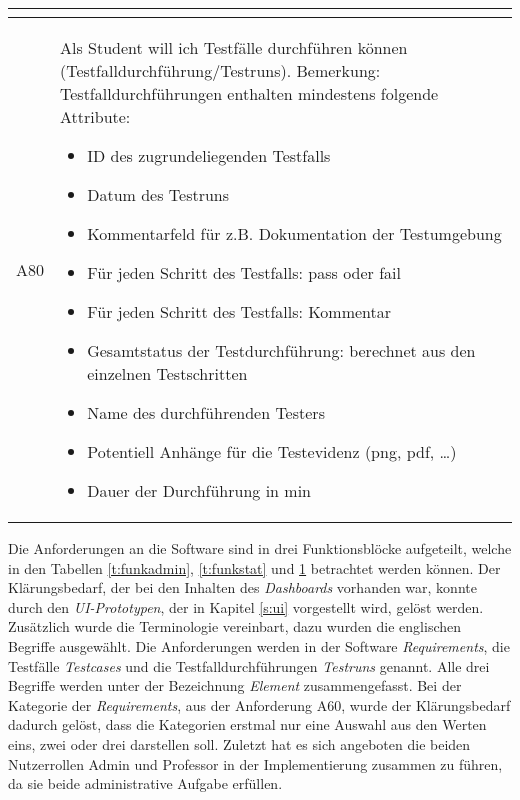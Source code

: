 \documentclass[11pt,a4paper]{report}
\begin{document}
\begin{table}[htpb]
\begin{center}
\begin{tabular}{|p{}|p{}|}
\begin{itemize}
\end{itemize} \\


    \hline
       A80 & Als Student will ich Testfälle durchführen können (Testfalldurchführung/Testruns).
Bemerkung: Testfalldurchführungen enthalten mindestens folgende Attribute:
       
       \begin{itemize}
\setlength\itemsep{0.1em}
\item ID des zugrundeliegenden Testfalls
\item Datum des Testruns
\item Kommentarfeld für z.B. Dokumentation der Testumgebung
\item Für jeden Schritt des Testfalls: pass oder fail
\item Für jeden Schritt des Testfalls: Kommentar
\item Gesamtstatus der Testdurchführung: berechnet aus den einzelnen Testschritten
\item Name des durchführenden Testers
\item Potentiell Anhänge für die Testevidenz (png, pdf, …)
\item Dauer der Durchführung in min

\end{itemize}\\
    \hline
    
\end{tabular}
\end{center}
\label{t:funkanfundtest}
\end{table}



Die Anforderungen an die Software sind in drei Funktionsblöcke aufgeteilt, welche in den Tabellen \ref{t:funkadmin}, \ref{t:funkstat} und \ref{t:funkanfundtest} betrachtet werden können. Der Klärungsbedarf, der bei den Inhalten des \textit{Dashboards} vorhanden war, konnte durch den \textit{UI-Prototypen}, der in Kapitel \ref{s:ui} vorgestellt wird, gelöst werden. Zusätzlich wurde die Terminologie vereinbart, dazu wurden die englischen Begriffe ausgewählt. Die Anforderungen werden in der Software \textit{Requirements}, die Testfälle \textit{Testcases} und die Testfalldurchführungen \textit{Testruns} genannt. Alle drei Begriffe werden unter der Bezeichnung \textit{Element} zusammengefasst. Bei der Kategorie der \textit{Requirements}, aus der Anforderung A60, wurde der Klärungsbedarf dadurch gelöst, dass die Kategorien erstmal nur eine Auswahl aus den Werten eins, zwei oder drei darstellen soll. Zuletzt hat es sich angeboten die beiden Nutzerrollen Admin und Professor in der Implementierung zusammen zu führen, da sie beide administrative Aufgabe erfüllen.
\end{document}
